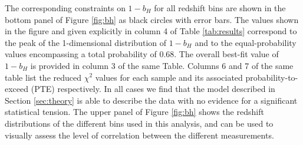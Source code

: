 \documentclass[useAMS,usenatbib]{mn2e}
\begin{document}
      The corresponding constraints on $1-b_H$ for all redshift bins are shown in the bottom panel of Figure \ref{fig:bh} as black circles with error bars. The values shown in the figure and given explicitly in column 4 of Table \ref{tab:results} correspond to the peak of the 1-dimensional distribution of $1-b_H$ and to the equal-probability values encompassing a total probability of 0.68. The overall best-fit value of $1-b_H$ is provided in column 3 of the same Table. Columns 6 and 7 of the same table list the reduced $\chi^2$ values for each sample and its associated probability-to-exceed (PTE) respectively. In all cases we find that the model described in Section \ref{sec:theory} is able to describe the data with no evidence for a significant statistical tension. The upper panel of Figure \ref{fig:bh} shows the redshift distributions of the different bins used in this analysis, and can be used to visually assess the level of correlation between the different measurements.
\end{document}
